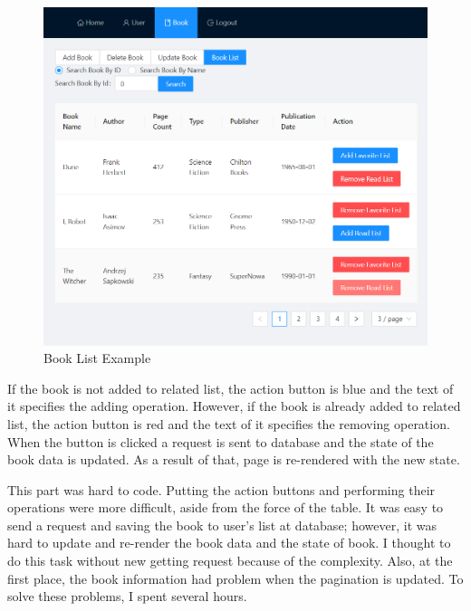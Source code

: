 \begin{minipage}{.49\textwidth}
  \begin{figure}[H]
    \centering
    \includegraphics[width=\linewidth]{img/front-end/book-list-example.png}
    \caption{Book List Example}
  \end{figure}
\end{minipage}

If the book is not added to related list, the action button is blue and the text of it specifies the adding operation. However, if the book is already added to related list, the action button is red and the text of it specifies the removing operation. When the button is clicked a request is sent to database and the state of the book data is updated. As a result of that, page is re-rendered with the new state.

This part was hard to code. Putting the action buttons and performing their operations were more difficult, aside from the force of the table. It was easy to send a request and saving the book to user's list at database; however, it was hard to update and re-render the book data and the state of book. I thought to do this task without new getting request because of the complexity. Also, at the first place, the book information had problem when the pagination is updated. To solve these problems, I spent several hours.
